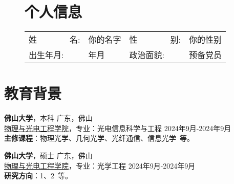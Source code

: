 \begin{figure}[h]
    \begin{minipage}{0.82\textwidth}
        \section{\makebox[\widthof{\faAddressCard}][c]{\color{FOSU_Red}{\faAddressCard}}\quad 个人信息}
        \begin{tabularx}{\linewidth}{p{}Xp{}X}
            姓\ \ \ \ \ \ \ \ 名: & 你的名字 & 
            性\ \ \ \ \ \ \ \ 别: & 你的性别  \\
            出生年月:              & 年月 & 
            政治面貌:              & 预备党员 \\
           
        \end{tabularx}
    \end{minipage}
    \hspace{2em}
    \begin{minipage}{0.12\textwidth}   
        \setlength{\fboxsep}{0pt}
    \end{minipage}

\end{figure}
\vspace{-1em}

\section{\makebox[\widthof{\faGraduationCap}][c]{\color{FOSU_Red}{\faGraduationCap}}\quad 教育背景}
\vspace{0.5em}
{\large \textbf{佛山大学}}，本科 \hfill {广东，佛山} \\
{{\href{https://www.fosu.edu.cn/spoe/}{物理与光电工程学院}}}，专业：光电信息科学与工程 \hfill {2024年9月-2024年9月} \\
\textbf{主修课程}：物理光学、几何光学、光纤通信、信息光学\ 等。


\vspace{0.5em}
{\large \textbf{佛山大学}}，硕士 \hfill {广东，佛山} \\
{{\href{https://www.fosu.edu.cn/spoe/}{物理与光电工程学院}}}，专业：光学工程 \hfill {2024年9月-2024年9月} \\
\textbf{研究方向}：1、2\ 等。

